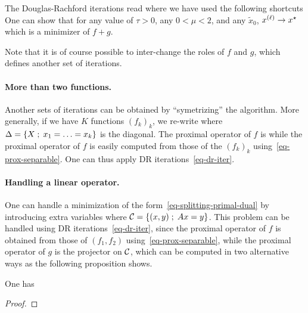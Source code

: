 The Douglas-Rachford iterations read
where we have used the following shortcuts
One can show that for any value of $\tau>0$, any $0 < \mu < 2$,  and any $\tilde x_0$, $\it{x} \rightarrow x^\star$ which is a minimizer of $f+g$.

Note that it is of course possible to inter-change the roles of $f$ and $g$, which defines another set of iterations.

\paragraph{More than two functions.}

Another sets of iterations can be obtained by ``symetrizing'' the algorithm. More generally, if we have $K$ functions $(f_k)_k$, we re-write 
where $\Delta=\enscond{X}{x_1=\ldots=x_k}$ is the diagonal. The proximal operator of $f$ is 
while the proximal operator of $f$ is easily computed from those of the $(f_k)_k$ using~\eqref{eq-prox-separable}. One can thus apply DR iterations~\eqref{eq-dr-iter}.

\paragraph{Handling a linear operator.}

One can handle a minimization of the form~\eqref{eq-splitting-primal-dual} by introducing extra variables
where $\Cc=\enscond{(x,y)}{Ax=y}$. This problem can be handled using DR iterations~\eqref{eq-dr-iter}, since the proximal operator of $f$ is obtained from those of $(f_1,f_2)$ using~\eqref{eq-prox-separable}, while the proximal operator of $g$ is the projector on $\Cc$, which can be computed in two alternative ways as the following proposition shows.

\begin{prop}One has
\end{prop}
\begin{proof}
\end{proof}

